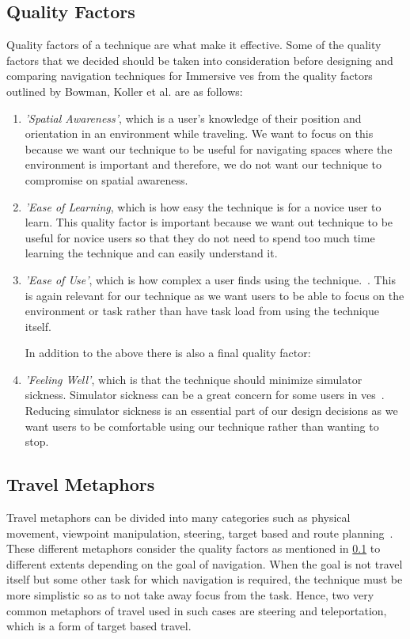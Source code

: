 \subsection{Quality Factors}
\label{subsection RW Navigation: Quality Factors}
Quality factors of a technique are what make it effective. Some of the quality factors that we decided should be taken into consideration before designing and comparing navigation techniques for Immersive \acrshort{ve}s from the quality factors outlined by Bowman, Koller et al. are as follows:
\begin{enumerate}
	\item \textit{'Spatial Awareness'}, which is a user's knowledge of their position and orientation in an environment while traveling. We want to focus on this because we want our technique to be useful for navigating spaces where the environment is important and therefore, we do not want our technique to compromise on spatial awareness.
	\item \textit{'Ease of Learning}, which is how easy the technique is for a novice user to learn. This quality factor is important because we want out technique to be useful for novice users so that they do not need to spend too much time learning the technique and can easily understand it.
	\item \textit{'Ease of Use'}, which is how complex a user finds using the technique.~\cite{Bowman1997}. This is again relevant for our technique as we want users to be able to focus on the environment or task rather than have task load from using the technique itself. 
	
	In addition to the above there is also a final quality factor:
	\item \textit{'Feeling Well'}, which is that the technique should minimize simulator sickness. Simulator sickness can be a great concern for some users in \acrshort{ve}s~\cite{LaViola2000}. Reducing simulator sickness is an essential part of our design decisions as we want users to be comfortable using our technique rather than wanting to stop.
\end{enumerate}

\subsection{Travel Metaphors}
\label{subsection RW Navigation: Travel Metaphors}
Travel metaphors can be divided into many categories such as physical movement, viewpoint manipulation, steering, target based and route planning~\cite{Bowman2001}. These different metaphors consider the quality factors as mentioned in \cref{subsection RW Navigation: Quality Factors} to different extents depending on the goal of navigation. When the goal is not travel itself but some other task for which navigation is required, the technique must be more simplistic so as to not take away focus from the task. Hence, two very common metaphors of travel used in such cases are steering and teleportation, which is a form of target based travel.

